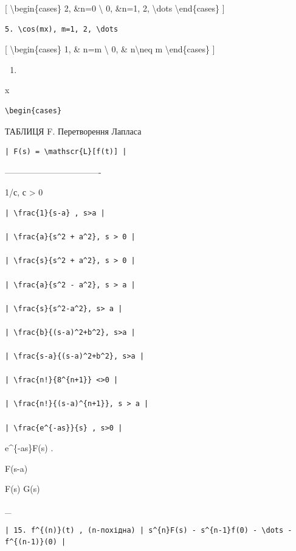 \documentclass[
]{article}
\providecommand{\tightlist}{%
  \setlength{\itemsep}{0pt}\setlength{\parskip}{0pt}}
\begin{document}
{{[} \textbackslash begin\{cases\} 2, \&n=0 \textbackslash{} 0, \&n=1, 2,
\textbackslash dots \textbackslash end\{cases\} {]}

\begin{verbatim}
5. \cos(mx), m=1, 2, \dots
\end{verbatim}

{[} \textbackslash begin\{cases\} 1, \& n=m \textbackslash{} 0, \&
n\textbackslash neq m \textbackslash end\{cases\} {]}

\begin{enumerate}
\def\labelenumi{\arabic{enumi}.}
\setcounter{enumi}{5}
\tightlist
\item
\end{enumerate}

x

\begin{verbatim}
\begin{cases}
\end{verbatim}

ТАБЛИЦЯ F. Перетворення Лапласа

\begin{verbatim}
| F(s) = \mathscr{L}[f(t)] |
\end{verbatim}

\textbar----------------------------------\textbar{}

1/с, с \textgreater{} 0 \textbar{}

\begin{verbatim}
| \frac{1}{s-a} , s>a |

| \frac{a}{s^2 + a^2}, s > 0 |

| \frac{s}{s^2 + a^2}, s > 0 |

| \frac{a}{s^2 - a^2}, s > a |

| \frac{s}{s^2-a^2}, s> a |

| \frac{b}{(s-a)^2+b^2}, s>a |

| \frac{s-a}{(s-a)^2+b^2}, s>a |

| \frac{n!}{8^{n+1}} <>0 |

| \frac{n!}{(s-a)^{n+1}}, s > a |

| \frac{e^{-as}}{s} , s>0 |
\end{verbatim}

e\^{}\{-as\}F(s) . \textbar{}

F(s-a) \textbar{}

F(s) G(s) \textbar{}

\_ \textbar{}

\begin{verbatim}
| 15. f^{(n)}(t) , (n-похідна) | s^{n}F(s) - s^{n-1}f(0) - \dots - f^{(n-1)}(0) |
\end{verbatim}

}
\end{document}
